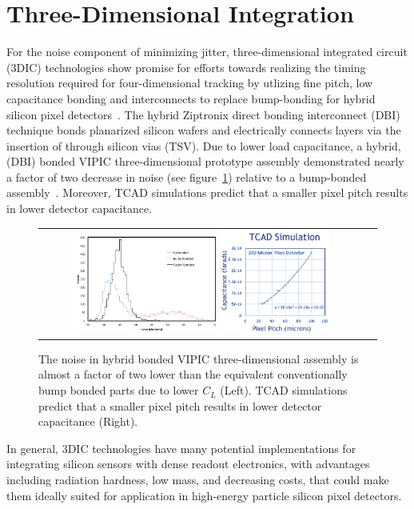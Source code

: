 \section{Three-Dimensional Integration}
For the noise component of minimizing jitter, three-dimensional integrated circuit (3DIC) technologies show promise for efforts towards realizing the timing resolution required for four-dimensional tracking by utlizing fine pitch, low capacitance bonding and interconnects to replace bump-bonding for hybrid silicon pixel detectors~\cite{7167712,7027258}. 
The hybrid Ziptronix direct bonding interconnect (DBI) technique bonds planarized silicon wafers and electrically connects layers via the insertion of through silicon vias (TSV). 
Due to lower load capacitance, a hybrid, (DBI) bonded VIPIC three-dimensional prototype assembly demonstrated nearly a factor of two decrease in noise (see figure~\ref{FusionBondedNoise_PixelPitchCapacitance}) relative to a bump-bonded assembly~\cite{Lipton:2018mqk}.  
Moreover, TCAD simulations predict that a smaller pixel pitch results in lower detector capacitance.
\begin{figure}[htb]
  \begin{center}
    \begin{tabular}{cc}
        \includegraphics[width=0.45\textwidth]{fig_FastTiming/FusionBondedNoise.png}
        \includegraphics[width=0.35\textwidth]{fig_FastTiming/PixelPitch_Capacitance.png}
    \end{tabular}
    \caption{The noise in hybrid bonded VIPIC three-dimensional assembly is almost a factor of two lower than the equivalent conventionally bump bonded parts due to lower $C_L$ (Left).
            TCAD simulations predict that a smaller pixel pitch results in lower detector capacitance (Right).
            }            
    \label{FusionBondedNoise_PixelPitchCapacitance}
  \end{center}
\end{figure}
In general, 3DIC technologies have many potential implementations for integrating silicon sensors with dense readout electronics, with advantages including radiation hardness, low mass, and decreasing costs, that could make them ideally suited for application in high-energy particle silicon pixel detectors.

